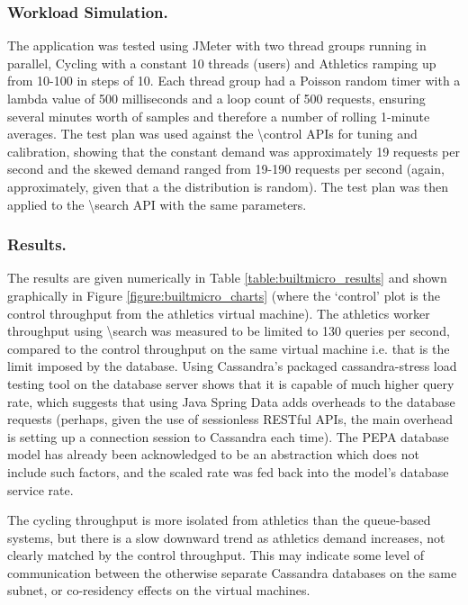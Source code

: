 \subsubsection{Workload Simulation.}  The application was tested using JMeter with two thread groups running in parallel, Cycling with a constant 10 threads (users) and Athletics ramping up from 10-100 in steps of 10.  Each thread group had a Poisson random timer with a lambda value of 500 milliseconds and a loop count of 500 requests, ensuring several minutes worth of samples and therefore a number of rolling 1-minute averages.  The test plan was used against the {\textbackslash control} APIs for tuning and calibration, showing that the constant demand was approximately 19 requests per second and the skewed demand ranged from 19-190 requests per second (again, approximately, given that a the distribution is random). The test plan was then applied to the {\textbackslash search} API with the same parameters.

\subsubsection{Results.}  The results are given numerically in Table \ref{table:builtmicro_results} and shown graphically in Figure \ref{figure:builtmicro_charts} (where the `control' plot is the control throughput from the athletics virtual machine).  The athletics worker throughput using {\textbackslash search} was measured to be limited to 130 queries per second, compared to the control throughput on the same virtual machine i.e. that is the limit imposed by the database.  Using Cassandra's packaged cassandra-stress load testing tool on the database server shows that it is capable of much higher query rate, which suggests that using Java Spring Data adds overheads to the database requests (perhaps, given the use of sessionless RESTful APIs, the main overhead is setting up a connection session to Cassandra each time).  The PEPA database model has already been acknowledged to be an abstraction which does not include such factors, and the scaled rate was fed back into the model's database service rate.

The cycling throughput is more isolated from athletics than the queue-based systems, but there is a slow downward trend as athletics demand increases, not clearly matched by the control throughput.  This may indicate some level of communication between the otherwise separate Cassandra databases on the same subnet, or co-residency effects on the virtual machines.

